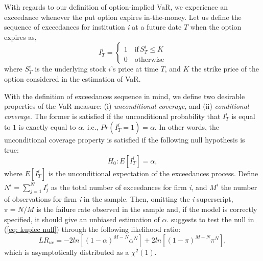 \documentclass[11pt,a4paper,english]{article}
\begin{document}
With regards to our definition of option-implied VaR, we experience an exceedance whenever the put option expires in-the-money. Let us define the sequence of exceedances for institution \textit{i} at a future date $T$ when the option expires as,
\begin{equation}
\label{eq: violations}
I^i_{T} =
\begin{cases}
1 \quad \textrm{if} \, S^i_T\leq K \\
0 \quad \textrm{otherwise}
\end{cases}
\end{equation}
where $S_T^i$ is the underlying stock $i$'s price at time $T$, and $K$ the strike price of the option considered in the estimation of VaR.

With the definition of exceedances sequence in mind, we define two desirable properties of the VaR measure: (i) \textit{unconditional coverage}, and (ii) \textit{conditional coverage}. The former is satisfied if the unconditional probability that $I_T^i$ is equal to $1$ is exactly equal to $\alpha$, i.e., $Pr(I_T^i=1)=\alpha$. In other words, the unconditional coverage property is satisfied if the following null hypothesis is true:
\begin{equation}
\label{eq: kupiec null}
H_0: E[I_T^i] = \alpha,
\end{equation}
where $E[I_T^i]$ is the unconditional expectation of the exceedances process. Define $N^i=\sum_{j=1}^{N^i}I_j^i$ as the total number of exceedances for firm \textit{i}, and $M^i$ the number of observations for firm \textit{i} in the sample. Then, omitting the \textit{i} superscript, $\pi=N/M$ is the failure rate observed in the sample and, if the model is correctly specified, it should give an unbiased estimation of $\alpha$. \citet{Kupiec1995} suggests to test the null in (\ref{eq: kupiec null}) through the following likelihood ratio:
\begin{equation}
\label{eq: lruc}
LR_{uc} = -2ln[(1-\alpha)^{M-N}\alpha^N]+2ln[(1-\pi)^{M-N}\pi^N],
\end{equation}
which is asymptotically distributed as a $\chi^2(1)$.
\end{document}

